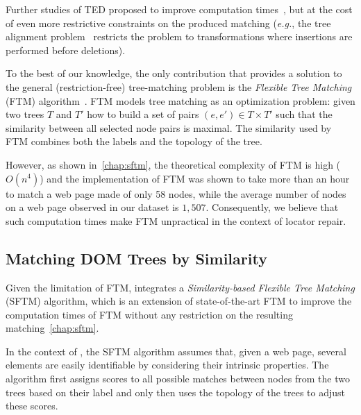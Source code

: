 Further studies of TED proposed to improve computation times~\cite{jiang1995alignment, valiente2001efficient, zhang1996constrained}, but at the cost of even more restrictive constraints on the produced matching (\emph{e.g.}, the tree alignment problem~\cite{jiang1995alignment} restricts the problem to transformations where insertions are performed before deletions).

To the best of our knowledge, the only contribution that provides a solution to the general (restriction-free) tree-matching problem is the \emph{Flexible Tree Matching} (FTM) algorithm~\cite{Kumar2011_FTM}.
FTM models tree matching as an optimization problem: given two trees $T$ and $T'$ how to build a set of pairs $(e,e') \in T \times T'$ such that the similarity between all selected node pairs is maximal.
The similarity used by FTM combines both the labels and the topology of the tree.

However, as shown in~\ref{chap:sftm}, the theoretical complexity of FTM is high ($O(n^4)$) and the implementation of FTM was shown to take more than an hour to match a web page made of only 58 nodes, while the average number of nodes on a web page observed in our dataset is $1,507$.
Consequently, we believe that such computation times make FTM unpractical in the context of locator repair.


\subsection{Matching DOM Trees by Similarity}\label{erratum:sec:SFTM}
Given the limitation of FTM, \erratum{} integrates a \emph{Similarity-based Flexible Tree Matching} (SFTM) algorithm, which is an extension of state-of-the-art FTM to improve the computation times of FTM without any restriction on the resulting matching~\ref{chap:sftm}. 

In the context of \erratum{}, the SFTM algorithm assumes that, given a web page, several elements are easily identifiable by considering their intrinsic properties.
The algorithm first assigns scores to all possible matches between nodes from the two trees based on their label and only then uses the topology of the trees to adjust these scores.

